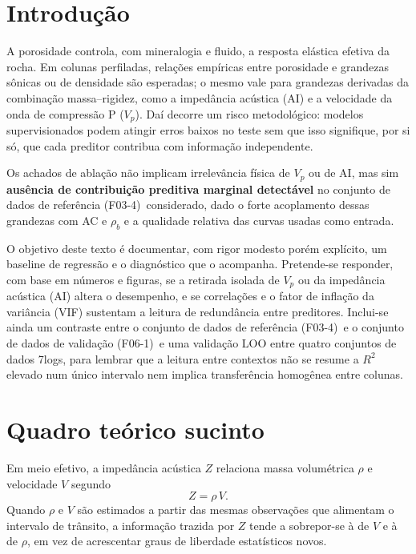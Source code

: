 \documentclass[12pt,a4paper]{article}
\newcommand{\dadosref}{conjunto de dados de referência (F03-4)}
\newcommand{\dadosval}{conjunto de dados de validação (F06-1)}
\begin{document}
\section{Introdução}\label{sec:intro}

A porosidade controla, com mineralogia e fluido, a resposta elástica efetiva da
rocha. Em colunas perfiladas, relações empíricas entre porosidade e
grandezas sônicas ou de densidade são esperadas; o mesmo vale para grandezas
derivadas da combinação massa--rigidez, como a impedância acústica (AI) e a
velocidade da onda de compressão P (\(V_p\)). Daí decorre um risco metodológico: modelos supervisionados
podem atingir erros baixos no teste sem que isso signifique, por si só, que cada
preditor contribua com informação independente.

Os achados de ablação não implicam irrelevância física de \(V_p\) ou de AI,
mas sim \textbf{ausência de contribuição preditiva marginal detectável} no
\dadosref\ considerado, dado o forte acoplamento dessas grandezas com AC e \(\rho_b\) e a
qualidade relativa das curvas usadas como entrada.

O objetivo deste texto é documentar, com rigor modesto porém explícito, um
baseline de regressão e o diagnóstico que o acompanha. Pretende-se responder,
com base em números e figuras, se a retirada isolada de \(V_p\) ou da impedância
acústica (AI) altera o desempenho, e se correlações e o fator de inflação
da variância (VIF) sustentam a
leitura de redundância entre preditores. Inclui-se ainda um contraste entre o
\dadosref\ e o \dadosval\ e uma validação LOO entre quatro conjuntos de dados 7logs, para
lembrar que a leitura entre contextos não se resume a \(R^2\) elevado num único intervalo
nem implica transferência homogênea entre colunas.

\section{Quadro teórico sucinto}\label{sec:fund}

Em meio efetivo, a impedância acústica \(Z\) relaciona massa volumétrica
\(\rho\) e velocidade \(V\) segundo
\begin{equation}\label{eq:impedancia}
Z = \rho\,V .
\end{equation}
Quando \(\rho\) e \(V\) são estimados a partir das mesmas observações que
alimentam o intervalo de trânsito, a informação trazida por \(Z\) tende a
sobrepor-se à de \(V\) e à de \(\rho\), em vez de acrescentar graus de liberdade
estatísticos novos.
\end{document}
